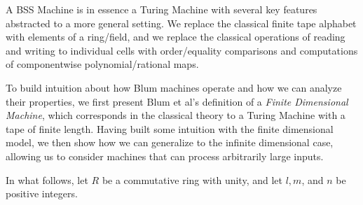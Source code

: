 A BSS Machine is in essence a Turing Machine with several key features
abstracted to a more general setting. We replace the classical finite
tape alphabet with elements of a ring/field, and we replace the
classical operations of reading and writing to individual cells with
order/equality comparisons and computations of componentwise
polynomial/rational maps.
 
To build intuition about how Blum machines operate and how we can
analyze their properties, we first present Blum et al's definition of
a \emph{Finite Dimensional Machine}, which corresponds in the
classical theory to a Turing Machine with a tape of finite length.
Having built some intuition with the finite dimensional model, we then
show how we can generalize to the infinite dimensional case, allowing
us to consider machines that can process arbitrarily large inputs.

In what follows, let $R$ be a commutative ring with unity, and let $l,
m$, and $n$ be positive integers.

